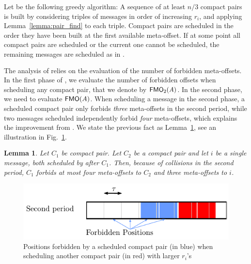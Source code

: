 \documentclass[pdflatex,sn-mathphys,iicol]{sn-jnl}%
\theoremstyle{thmstyleone}%
\newtheorem{lemma}[theorem]{Lemma}
\theoremstyle{thmstyletwo}%
\theoremstyle{thmstylethree}%
\begin{document}
Let \compactpair be the following greedy algorithm:  A sequence of at least $n/3$ compact pairs is built by considering triples of messages in order of increasing $r_i$, and applying Lemma~\ref{lemma:pair_find} to each triple. Compact pairs are scheduled in the order they have been built at the first available meta-offset. If at some point all compact pairs are scheduled or the current one cannot be scheduled, the remaining messages are scheduled as in \metaoffset. 

The analysis of \compactpair relies on the evaluation of the number of forbidden meta-offsets. In the first phase of \compactpair, we evaluate the number of forbidden offsets when scheduling any compact pair, that we denote by $\textsf{FMO}_2(A)$. In the second phase, we need to evaluate $\textsf{FMO}(A)$. When scheduling a message in the second phase, a scheduled compact pair only forbids \emph{three} meta-offsets in the second period, while two messages scheduled independently forbid \emph{four} meta-offsets, which explains the improvement from \compactpair. We state the previous fact as Lemma~\ref{lemma:pair_forbid}, see an illustration in Fig.~\ref{fig:forbidenmeta}. 

\begin{lemma}\label{lemma:pair_forbid}
Let $C_1$ be compact pair. Let $C_2$ be a compact pair and let $i$ be a single message, both scheduled by \compactpair after $C_1$.
Then, because of collisions in the second period, $C_1$ forbids at most four meta-offsets to $C_2$ and three meta-offsets to $i$. 
\end{lemma}

\begin{figure}
\begin{center}
\includegraphics[scale=0.7]{pairforbiden}
\end{center}

\caption{Positions forbidden by a scheduled compact pair (in blue) when scheduling another compact pair (in red) with larger $r_i$'s} 
\label{fig:forbidenmeta}
\end{figure}
\end{document}
